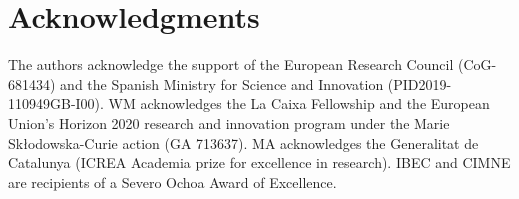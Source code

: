 \documentclass[12pt]{iopart}
\begin{document}
	
	
	
	\section*{Acknowledgments}
	The authors acknowledge the support of the European Research Council (CoG-681434) and the Spanish Ministry for Science and Innovation (PID2019-110949GB-I00). WM acknowledges the La Caixa Fellowship  and the European Union’s Horizon 2020 research and innovation program under the Marie Skłodowska-Curie action (GA 713637). MA acknowledges the Generalitat de Catalunya (ICREA Academia prize for excellence in research). IBEC and CIMNE are recipients of a Severo Ochoa Award of Excellence.
	
	\appendix
	
\end{document}

